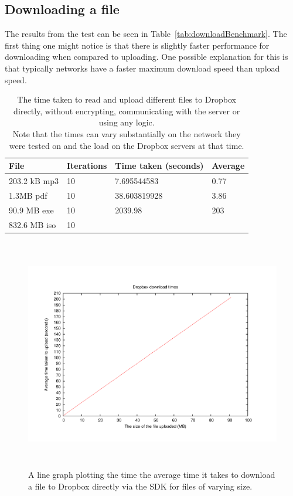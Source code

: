 \documentclass[12pt, titlepage]{article}
\begin{document}
\subsection{Downloading a file}
The results from the test can be seen in Table~\ref{tab:downloadBenchmark}. The first thing one might notice is that there is slightly faster performance for downloading when compared to uploading. One possible explanation for this is that typically networks have a faster maximum download speed than upload speed.


\bigskip
\begin{table}[h!]
\begin{center}
    \begin{tabular}{ | l | l | l | l |}
    \hline
    \textbf{File} & \textbf{Iterations} & \textbf{Time taken (seconds)} & \textbf{Average} \\ \hline
    
    203.2 kB mp3 & 10 & 7.695544583 & 0.77 \\ \hline
    1.3MB pdf & 10 & 38.603819928 & 3.86 \\ \hline
    90.9 MB exe & 10 & 2039.98 & 203 \\ \hline
    832.6 MB iso & 10 & & \\ \hline    
    \end{tabular}
    \caption{The time taken to read and upload different files to Dropbox directly, without encrypting, communicating with the server or using any logic. \\ Note that the times can vary substantially on the network they were tested on and the load on the Dropbox servers at that time.} \label{tab:uploadDropboxBenchmark}
    \end{center}
\end{table}

\begin{figure}[!t]
\centerline{\includegraphics[height=4.0in,width=7in,angle=0]{plots/dropboxDownload/dropboxDownloadTimes.pdf}}
\caption{A line graph plotting the time the average time it takes to download a file to Dropbox directly via the SDK for files of varying size.}
\label{fig:loginLineGraph}
\end{figure}
\end{document}
